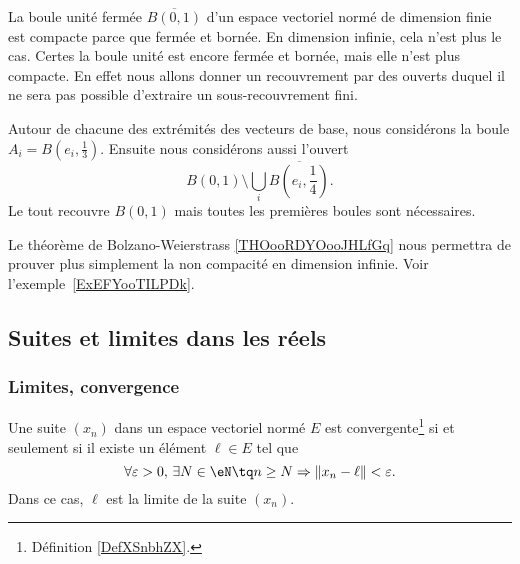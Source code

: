 \begin{example}
	La boule unité fermée \( \overline{ B(0,1) }\) d'un espace vectoriel normé de dimension finie est compacte parce que fermée et bornée. En dimension infinie, cela n'est plus le cas. Certes la boule unité est encore fermée et bornée, mais elle n'est plus compacte. En effet nous allons donner un recouvrement par des ouverts duquel il ne sera pas possible d'extraire un sous-recouvrement fini.

	Autour de chacune des extrémités des vecteurs de base, nous considérons la boule \( A_i=B(e_i,\frac{1}{ 3 })\). Ensuite nous considérons aussi l'ouvert
	\begin{equation}
		B(0,1)\setminus\bigcup_i\overline{ B(e_i,\frac{1}{ 4 })}.
	\end{equation}
	Le tout recouvre \( B(0,1)\) mais toutes les premières boules sont nécessaires.
\end{example}

Le théorème de Bolzano-Weierstrass \ref{THOooRDYOooJHLfGq} nous permettra de prouver plus simplement la non compacité en dimension infinie. Voir l'exemple~\ref{ExEFYooTILPDk}.

\subsection{Suites et limites dans les réels}

\subsubsection{Limites, convergence}

\begin{proposition}     \label{PROPooOSXCooJWXkWH}
	Une suite \( (x_n)\) dans un espace vectoriel normé \( E\) est convergente\footnote{Définition \ref{DefXSnbhZX}.} si et seulement si il existe un élément \( \ell\in E\) tel que
	\begin{equation}		\label{EQooJRAMooEphgem}
		\forall \varepsilon>0,\,\exists N\in\eN\tq n\geq N\Rightarrow \| x_n-\ell \|<\varepsilon.
	\end{equation}
	Dans ce cas, \( \ell\) est la limite de la suite \( (x_n)\).
\end{proposition}

